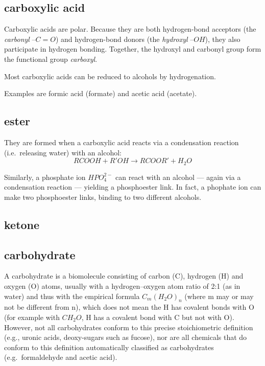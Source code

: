 \documentclass{article}
\begin{document}
\subsection{carboxylic acid}

Carboxylic acids are polar. Because they are both hydrogen-bond acceptors (the {\em
carbonyl\/} $–C=O$) and hydrogen-bond donors (the {\em hydroxyl\/} $–OH$), they also
participate in hydrogen bonding. Together, the hydroxyl and carbonyl group form the
functional group {\em carboxyl}.

Most carboxylic acids can be reduced to alcohols by hydrogenation.

Examples are formic acid (formate) and acetic acid (acetate).

\subsection{ester}

They are formed when a carboxylic acid reacts via a condensation reaction (i.e.\ releasing
water) with an alcohol:
\[
    RCOOH + R'OH \rightarrow RCOOR' + H_2O
\]

Similarly, a phosphate ion $HPO_4^{2-}$ can react with an alcohol --- again via a
condensation reaction --- yielding a phosphoester link. In fact, a phophate ion can make
two phosphoester links, binding to two different alcohols.

\subsection{ketone}

\subsection{carbohydrate}
A carbohydrate is a biomolecule consisting of carbon (C), hydrogen (H) and oxygen (O)
atoms, usually with a hydrogen–oxygen atom ratio of 2:1 (as in water) and thus with the
empirical formula $C_m{(H_2O)}_n$ (where m may or may not be different from n), which does
not mean the H has covalent bonds with O (for example with $CH_2O$, H has a covalent bond
with C but not with O). However, not all carbohydrates conform to this precise
stoichiometric definition (e.g., uronic acids, deoxy-sugars such as fucose), nor are all
chemicals that do conform to this definition automatically classified as carbohydrates
(e.g.\ formaldehyde and acetic acid).
\end{document}
